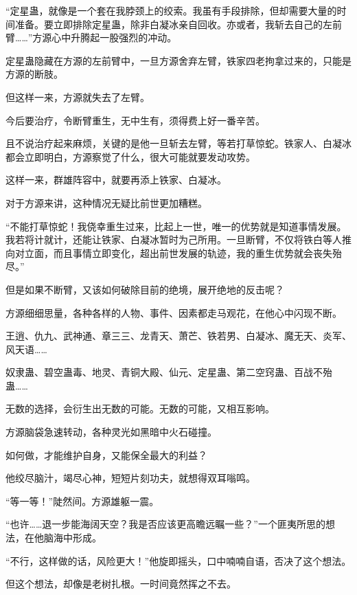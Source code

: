 
\begin{this_body}

“定星蛊，就像是一个套在我脖颈上的绞索。我虽有手段排除，但却需要大量的时间准备。要立即排除定星蛊，除非白凝冰亲自回收。亦或者，我斩去自己的左前臂……”方源心中升腾起一股强烈的冲动。

定星蛊隐藏在方源的左前臂中，一旦方源舍弃左臂，铁家四老拘拿过来的，只能是方源的断肢。

但这样一来，方源就失去了左臂。

今后要治疗，令断臂重生，无中生有，须得费上好一番辛苦。

且不说治疗起来麻烦，关键的是他一旦斩去左臂，等若打草惊蛇。铁家人、白凝冰都会立即明白，方源察觉了什么，很大可能就要发动攻势。

这样一来，群雄阵容中，就要再添上铁家、白凝冰。

对于方源来讲，这种情况无疑比前世更加糟糕。

“不能打草惊蛇！我侥幸重生过来，比起上一世，唯一的优势就是知道事情发展。我若将计就计，还能让铁家、白凝冰暂时为己所用。一旦断臂，不仅将铁白等人推向对立面，而且事情立即变化，超出前世发展的轨迹，我的重生优势就会丧失殆尽。”

但是如果不断臂，又该如何破除目前的绝境，展开绝地的反击呢？

方源细细思量，各种各样的人物、事件、因素都走马观花，在他心中闪现不断。

王逍、仇九、武神通、章三三、龙青天、萧芒、铁若男、白凝冰、魔无天、炎军、风天语……

奴隶蛊、碧空蛊毒、地灵、青铜大殿、仙元、定星蛊、第二空窍蛊、百战不殆蛊……

无数的选择，会衍生出无数的可能。无数的可能，又相互影响。

方源脑袋急速转动，各种灵光如黑暗中火石碰撞。

如何做，才能维护自身，又能保全最大的利益？

他绞尽脑汁，竭尽心神，短短片刻功夫，就想得双耳嗡鸣。

“等一等！”陡然间。方源雄躯一震。

“也许……退一步能海阔天空？我是否应该更高瞻远瞩一些？”一个匪夷所思的想法，在他脑海中形成。

“不行，这样做的话，风险更大！”他旋即摇头，口中喃喃自语，否决了这个想法。

但这个想法，却像是老树扎根。一时间竟然挥之不去。


\end{this_body}
